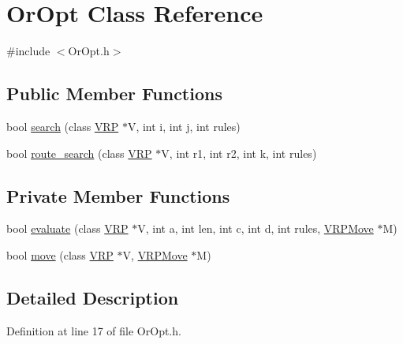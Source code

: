 \hypertarget{class_or_opt}{
\section{OrOpt Class Reference}
\label{class_or_opt}
}


{\ttfamily \#include $<$OrOpt.h$>$}

\subsection*{Public Member Functions}
\begin{DoxyCompactItemize}
\item 
bool \hyperlink{class_or_opt_ae8df6617295301ec8591dad3c869d002}{search} (class \hyperlink{class_v_r_p}{VRP} $\ast$V, int i, int j, int rules)
\item 
bool \hyperlink{class_or_opt_a3ed869c764beece77a430a5c5d87e439}{route\_\-search} (class \hyperlink{class_v_r_p}{VRP} $\ast$V, int r1, int r2, int k, int rules)
\end{DoxyCompactItemize}
\subsection*{Private Member Functions}
\begin{DoxyCompactItemize}
\item 
bool \hyperlink{class_or_opt_a0bef223452522d6b54b9b8aa88923855}{evaluate} (class \hyperlink{class_v_r_p}{VRP} $\ast$V, int a, int len, int c, int d, int rules, \hyperlink{class_v_r_p_move}{VRPMove} $\ast$M)
\item 
bool \hyperlink{class_or_opt_a599424fbfe7f8631b74369d931f80fd4}{move} (class \hyperlink{class_v_r_p}{VRP} $\ast$V, \hyperlink{class_v_r_p_move}{VRPMove} $\ast$M)
\end{DoxyCompactItemize}


\subsection{Detailed Description}


Definition at line 17 of file OrOpt.h.




